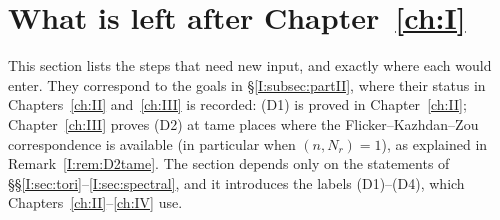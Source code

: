 \section{What is left after Chapter~\ref{ch:I}}\label{I:sec:deferred}
This section lists the steps that need new input, and exactly where each would enter. They correspond to the goals in \S\ref{I:subsec:partII}, where their status in Chapters~\ref{ch:II} and~\ref{ch:III} is recorded: (D1) is proved in Chapter~\ref{ch:II}; Chapter~\ref{ch:III} proves (D2) at tame places where the Flicker--Kazhdan--Zou correspondence is available (in particular when $(n,N_r)=1$), as explained in Remark~\ref{I:rem:D2tame}. The section depends only on the statements of \S\S\ref{I:sec:tori}--\ref{I:sec:spectral}, and it introduces the labels (D1)--(D4), which Chapters~\ref{ch:II}--\ref{ch:IV} use.


